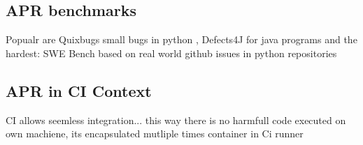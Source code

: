 \subsection{APR benchmarks}
Popualr are Quixbugs small bugs in python , Defects4J for java programs and the hardest: SWE Bench based on real world github issues in python repositories


\subsection{APR in CI Context}

CI allows seemless integration...
this way there is no harmfull code executed on own machiene, its encapsulated mutliple times container in Ci runner
